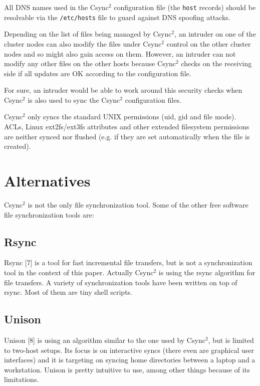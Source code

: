 \documentclass[a4paper,twocolumn]{article}
\def\csync2{{\sc Csync$^{2}$}}
\begin{document}
All DNS names used in the \csync2 configuration file (the {\tt host} records)
should be resolvable via the {\tt /etc/hosts} file to guard against DNS
spoofing attacks.

Depending on the list of files being managed by \csync2, an intruder on one of
the cluster nodes can also modify the files under \csync2 control on the other
cluster nodes and so might also gain access on them. However, an intruder can
not modify any other files on the other hosts because \csync2 checks on the
receiving side if all updates are OK according to the configuration file.

For sure, an intruder would be able to work around this security checks when
\csync2 is also used to sync the \csync2 configuration files.

\csync2 only syncs the standard UNIX permissions (uid, gid and file mode).
ACLs, Linux ext2fs/ext3fs attributes and other extended filesystem permissions
are neither synced nor flushed (e.g. if they are set automatically when
the file is created).

\section{Alternatives}

\csync2 is not the only file synchronization tool. Some of the other
free software file synchronization tools are:

\subsection{Rsync}

Rsync [7] is a tool for fast incremental file transfers, but is not a
synchronization tool in the context of this paper. Actually \csync2 is
using the rsync algorithm for file transfers. A variety of synchronization
tools have been written on top of rsync. Most of them are tiny shell scripts.

\subsection{Unison}

Unison [8] is using an algorithm similar to the one used by \csync2, but is
limited to two-host setups. Its focus is on interactive syncs (there even are
graphical user interfaces) and it is targeting on syncing home directories
between a laptop and a workstation. Unison is pretty intuitive to use, among
other things because of its limitations.
\end{document}
